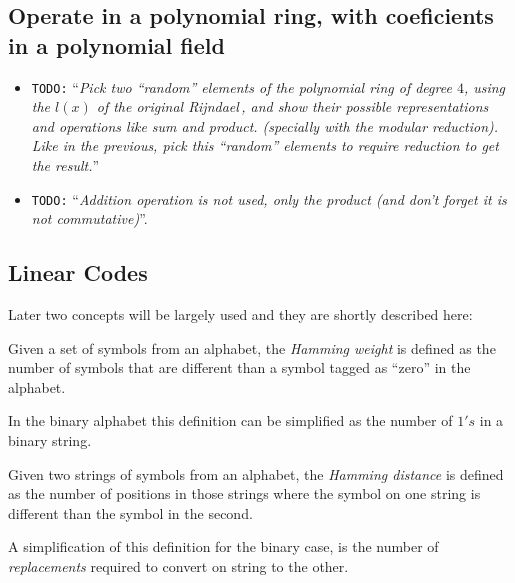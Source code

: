 \documentclass[10pt,a4paper,twoside]{llncs}
\newcommand{\todo}[1]{\texttt{\color{red}TODO:} ``\emph{#1}''}
\newcommand{\rijndael}{\emph{Rijndael}}
\begin{document}
\subsection{Operate in a polynomial ring, with coeficients in a polynomial field}\label{sec:polynomialRing}
\begin{itemize}
\item \todo{Pick two ``random'' elements of the polynomial ring of degree $4$, using the $l(x)$ of the original \rijndael\,, and show their possible representations and operations like sum and product. (specially with the modular reduction). Like in the previous, pick this ``random'' elements to require reduction to get the result.}
 \item \todo{Addition operation is not used, only the product (and don't forget it is not commutative)}.
\end{itemize}

\subsection{Linear Codes}\label{sec:LinearCodes}

Later two concepts will be largely used and they are shortly described here:

\begin{definition}\label{def:hammingWeight}
    Given a set of symbols from an alphabet, the \emph{Hamming weight} is defined as the number of symbols that are different than a symbol tagged as ``zero'' in the alphabet.
\end{definition}

In the binary alphabet this definition can be simplified as the number of $1's$ in a binary string.

\begin{definition}\label{def:hammingDistance}
    Given two strings of symbols from an alphabet, the \emph{Hamming distance} is defined as the number of positions in those strings where the symbol on one string is different than the symbol in the second.
\end{definition}

A simplification of this definition for the binary case, is the number of \emph{replacements} required to convert on string to the other.

\end{document}
